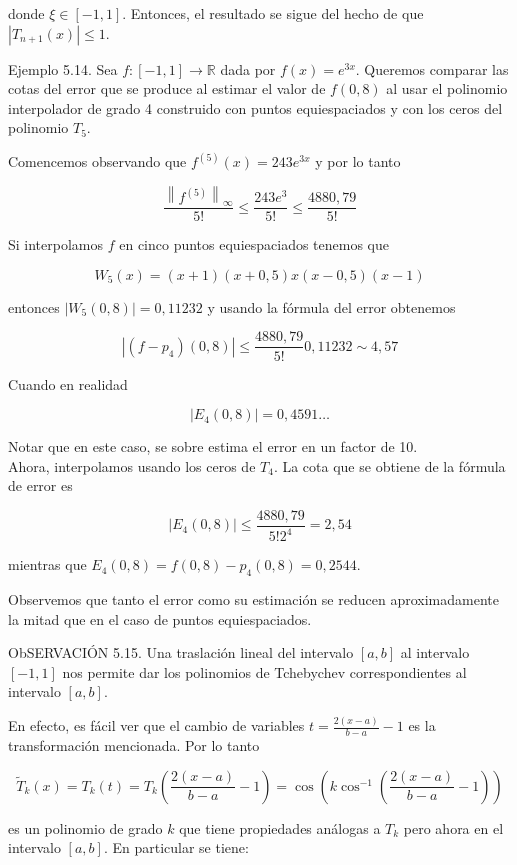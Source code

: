 \documentclass[10pt]{article}
\begin{document}
donde $\xi \in[-1,1]$. Entonces, el resultado se sigue del hecho de que $\left|T_{n+1}(x)\right| \leq 1$.

Ejemplo 5.14. Sea $f:[-1,1] \rightarrow \mathbb{R}$ dada por $f(x)=e^{3 x}$. Queremos comparar las cotas del error que se produce al estimar el valor de $f(0,8)$ al usar el polinomio interpolador de grado 4 construido con puntos equiespaciados y con los ceros del polinomio $T_{5}$.

Comencemos observando que $f^{(5)}(x)=243 e^{3 x}$ y por lo tanto

$$
\frac{\left\|f^{(5)}\right\|_{\infty}}{5!} \leq \frac{243 e^{3}}{5!} \leq \frac{4880,79}{5!}
$$

Si interpolamos $f$ en cinco puntos equiespaciados tenemos que

$$
W_{5}(x)=(x+1)(x+0,5) x(x-0,5)(x-1)
$$

entonces $\left|W_{5}(0,8)\right|=0,11232$ y usando la fórmula del error obtenemos

$$
\left|\left(f-p_{4}\right)(0,8)\right| \leq \frac{4880,79}{5!} 0,11232 \sim 4,57
$$

Cuando en realidad

$$
\left|E_{4}(0,8)\right|=0,4591 \ldots
$$

Notar que en este caso, se sobre estima el error en un factor de 10.\\
Ahora, interpolamos usando los ceros de $T_{4}$. La cota que se obtiene de la fórmula de error es

$$
\left|E_{4}(0,8)\right| \leq \frac{4880,79}{5!2^{4}}=2,54
$$

mientras que $E_{4}(0,8)=f(0,8)-p_{4}(0,8)=0,2544$.

Observemos que tanto el error como su estimación se reducen aproximadamente la mitad que en el caso de puntos equiespaciados.

ObSERVACIÓN 5.15. Una traslación lineal del intervalo $[a, b]$ al intervalo $[-1,1]$ nos permite dar los polinomios de Tchebychev correspondientes al intervalo $[a, b]$.

En efecto, es fácil ver que el cambio de variables $t=\frac{2(x-a)}{b-a}-1$ es la transformación mencionada. Por lo tanto

$$
\widetilde{T}_{k}(x)=T_{k}(t)=T_{k}\left(\frac{2(x-a)}{b-a}-1\right)=\cos \left(k \cos ^{-1}\left(\frac{2(x-a)}{b-a}-1\right)\right)
$$

es un polinomio de grado $k$ que tiene propiedades análogas a $T_{k}$ pero ahora en el intervalo $[a, b]$. En particular se tiene:
\end{document}
